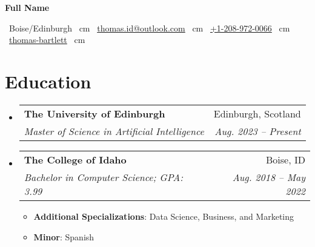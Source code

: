 \documentclass[letterpaper,11pt]{article}
\makeatletter
\newcommand{\resumeItemColon}[2]{
  \item\small{
    \textbf{#1}{: #2 \vspace{-2pt}}
  }
}
\newcommand{\resumeSubheading}[4]{
  \vspace{-1pt}\item
    \begin{tabular*}{0.97\textwidth}[t]{l@{\extracolsep{\fill}}r}
      \textbf{#1} & #2 \\
      \textit{\small#3} & \textit{\small #4} \\
    \end{tabular*}\vspace{-5pt}
}
\newcommand{\resumeSubHeadingListStart}{\begin{itemize}[leftmargin=*]}
\newcommand{\resumeSubHeadingListEnd}{\end{itemize}}
\newcommand{\resumeItemListStart}{\begin{itemize}}
\newcommand{\resumeItemListEnd}{\end{itemize}\vspace{-5pt}}
\newenvironment{header}{
    \setlength{\topsep}{0pt}\par\kern\topsep\centering\linespread{1.5}
}{
    \par\kern\topsep
} %
\let\hrefWithoutArrow\href
\renewcommand{\href}[2]{\hrefWithoutArrow{#1}{\mbox{\ifthenelse{\equal{#2}{}}{ }{#2 }\raisebox{.15ex}{\footnotesize \faExternalLink*}}}}
\makeatother
\begin{document}

\begin{header}
  \textbf{\fontsize{30 pt}{30 pt}\selectfont Full Name}

  \vspace{0.3 cm}

  \normalsize
  \mbox{
      {\color{black}{\footnotesize\faMapMarker*}\hspace*{0.13cm}Boise/Edinburgh}
  }
   cm
  \mbox{
      \hrefWithoutArrow{mailto:thomas.id@outlook.com}{\color{black}{\footnotesize\faEnvelope[regular]}\hspace*{0.13cm}thomas.id@outlook.com}
  }
   cm
  \mbox{
      \hrefWithoutArrow{tel:+12089720066}{\color{black}{\footnotesize\faPhone*}\hspace*{0.13cm}+1-208-972-0066}
  }
   cm
  \mbox{
      \hrefWithoutArrow{https://github.com/thomas-bartlett}{\color{black}{\footnotesize\faGithub}\hspace*{0.13cm}thomas-bartlett}
  }
   cm
\end{header}


\section{Education}
  \resumeSubHeadingListStart
    \resumeSubheading
      {The University of Edinburgh}{Edinburgh, Scotland}
      {Master of Science in Artificial Intelligence}{Aug. 2023 -- Present}
    \resumeSubheading
      {The College of Idaho}{Boise, ID}
      {Bachelor in Computer Science; GPA: 3.99}{Aug. 2018 -- May 2022}
      \resumeItemListStart
        \resumeItemColon{Additional Specializations}
          {Data Science, Business, and Marketing}
        \resumeItemColon{Minor}
          {Spanish}
      \resumeItemListEnd
  \resumeSubHeadingListEnd
\end{document}
